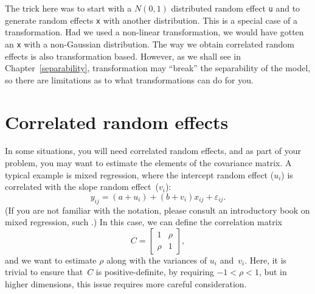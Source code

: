 \documentclass{admbmanual}
\newcommand{\citeasnoun}{\cite}
\begin{document}
The trick here was to start with a $N(0,1)$ distributed random effect \texttt{u} and to generate random
effects \texttt{x} with another distribution. This is a special case of a transformation. 
Had we used a non-linear transformation, we would have
gotten an \texttt{x} with a non-Gaussian distribution. The way we obtain correlated random
effects is also transformation based. However, as we shall see in Chapter~\ref{separability}, transformation
may ``break'' the separability of the model, so there are limitations as to what transformations can do for you.


\section{Correlated random effects\label{sec:correlated}} 

In some situations, you will need correlated random effects, and as part of your problem,
you may want to estimate the elements of the covariance matrix. A typical example is mixed
regression, where the intercept random effect ($u_{i}$) is correlated with the slope random effect~($v_{i}$):
\[
  y_{ij}=(a+u_{i})+\left(b+v_{i}\right)x_{ij}+\varepsilon_{ij}.
\]
(If you are not familiar with the notation, please consult an introductory book on mixed regression, such 
\citeasnoun{pinh:bate:2000}.) In this case, we can define the correlation matrix
\[
 C=\left[\begin{array}{cc}
 1 & \rho\\
 \rho & 1\end{array}\right],
\]
and we want to estimate $\rho$ along with the variances of $u_{i}$ and~$v_{i}$.
Here, it is trivial to ensure that~$C$ is positive-definite, by requiring $-1<\rho<1$, but in higher dimensions,
this issue requires more careful consideration. 
 
\end{document}
